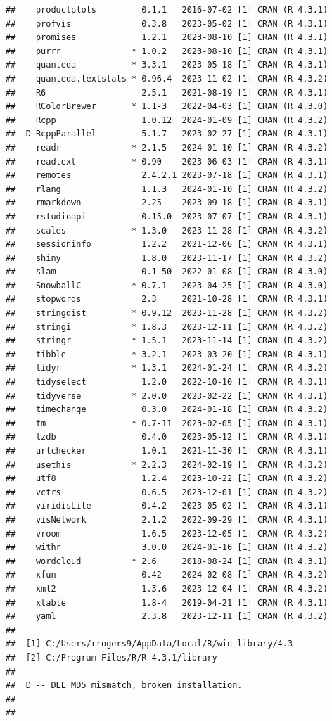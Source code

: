\documentclass[print]{nuthesis}
\begin{document}
\begin{verbatim}
##    productplots         0.1.1   2016-07-02 [1] CRAN (R 4.3.1)
##    profvis              0.3.8   2023-05-02 [1] CRAN (R 4.3.1)
##    promises             1.2.1   2023-08-10 [1] CRAN (R 4.3.1)
##    purrr              * 1.0.2   2023-08-10 [1] CRAN (R 4.3.1)
##    quanteda           * 3.3.1   2023-05-18 [1] CRAN (R 4.3.1)
##    quanteda.textstats * 0.96.4  2023-11-02 [1] CRAN (R 4.3.2)
##    R6                   2.5.1   2021-08-19 [1] CRAN (R 4.3.1)
##    RColorBrewer       * 1.1-3   2022-04-03 [1] CRAN (R 4.3.0)
##    Rcpp                 1.0.12  2024-01-09 [1] CRAN (R 4.3.2)
##  D RcppParallel         5.1.7   2023-02-27 [1] CRAN (R 4.3.1)
##    readr              * 2.1.5   2024-01-10 [1] CRAN (R 4.3.2)
##    readtext           * 0.90    2023-06-03 [1] CRAN (R 4.3.1)
##    remotes              2.4.2.1 2023-07-18 [1] CRAN (R 4.3.1)
##    rlang                1.1.3   2024-01-10 [1] CRAN (R 4.3.2)
##    rmarkdown            2.25    2023-09-18 [1] CRAN (R 4.3.1)
##    rstudioapi           0.15.0  2023-07-07 [1] CRAN (R 4.3.1)
##    scales             * 1.3.0   2023-11-28 [1] CRAN (R 4.3.2)
##    sessioninfo          1.2.2   2021-12-06 [1] CRAN (R 4.3.1)
##    shiny                1.8.0   2023-11-17 [1] CRAN (R 4.3.2)
##    slam                 0.1-50  2022-01-08 [1] CRAN (R 4.3.0)
##    SnowballC          * 0.7.1   2023-04-25 [1] CRAN (R 4.3.0)
##    stopwords            2.3     2021-10-28 [1] CRAN (R 4.3.1)
##    stringdist         * 0.9.12  2023-11-28 [1] CRAN (R 4.3.2)
##    stringi            * 1.8.3   2023-12-11 [1] CRAN (R 4.3.2)
##    stringr            * 1.5.1   2023-11-14 [1] CRAN (R 4.3.2)
##    tibble             * 3.2.1   2023-03-20 [1] CRAN (R 4.3.1)
##    tidyr              * 1.3.1   2024-01-24 [1] CRAN (R 4.3.2)
##    tidyselect           1.2.0   2022-10-10 [1] CRAN (R 4.3.1)
##    tidyverse          * 2.0.0   2023-02-22 [1] CRAN (R 4.3.1)
##    timechange           0.3.0   2024-01-18 [1] CRAN (R 4.3.2)
##    tm                 * 0.7-11  2023-02-05 [1] CRAN (R 4.3.1)
##    tzdb                 0.4.0   2023-05-12 [1] CRAN (R 4.3.1)
##    urlchecker           1.0.1   2021-11-30 [1] CRAN (R 4.3.1)
##    usethis            * 2.2.3   2024-02-19 [1] CRAN (R 4.3.2)
##    utf8                 1.2.4   2023-10-22 [1] CRAN (R 4.3.2)
##    vctrs                0.6.5   2023-12-01 [1] CRAN (R 4.3.2)
##    viridisLite          0.4.2   2023-05-02 [1] CRAN (R 4.3.1)
##    visNetwork           2.1.2   2022-09-29 [1] CRAN (R 4.3.1)
##    vroom                1.6.5   2023-12-05 [1] CRAN (R 4.3.2)
##    withr                3.0.0   2024-01-16 [1] CRAN (R 4.3.2)
##    wordcloud          * 2.6     2018-08-24 [1] CRAN (R 4.3.1)
##    xfun                 0.42    2024-02-08 [1] CRAN (R 4.3.2)
##    xml2                 1.3.6   2023-12-04 [1] CRAN (R 4.3.2)
##    xtable               1.8-4   2019-04-21 [1] CRAN (R 4.3.1)
##    yaml                 2.3.8   2023-12-11 [1] CRAN (R 4.3.2)
## 
##  [1] C:/Users/rrogers9/AppData/Local/R/win-library/4.3
##  [2] C:/Program Files/R/R-4.3.1/library
## 
##  D -- DLL MD5 mismatch, broken installation.
## 
## ----------------------------------------------------------
\end{verbatim}
\end{document}
